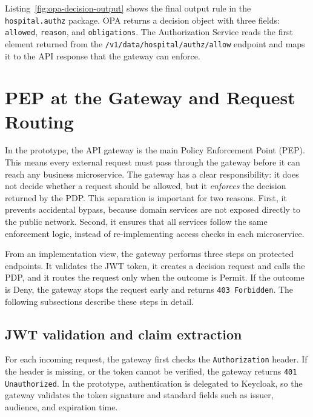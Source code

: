 Listing~\ref{fig:opa-decision-output} shows the final output rule in the \texttt{hospital.authz} package. OPA returns a decision object with three fields: \texttt{allowed}, \texttt{reason}, and \texttt{obligations}. The Authorization Service reads the first element returned from the \texttt{/v1/data/hospital/authz/allow} endpoint and maps it to the API response that the gateway can enforce.


\section{PEP at the Gateway and Request Routing}
\label{sec:gateway_pep}

In the prototype, the API gateway is the main Policy Enforcement Point (PEP). This means every external request must pass
through the gateway before it can reach any business microservice. The gateway has a clear responsibility: it does not
decide whether a request should be allowed, but it \textit{enforces} the decision returned by the PDP. This separation is
important for two reasons. First, it prevents accidental bypass, because domain services are not exposed directly to the
public network. Second, it ensures that all services follow the same enforcement logic, instead of re-implementing access
checks in each microservice.

\vspace{0.5cm}

From an implementation view, the gateway performs three steps on protected endpoints. It validates the JWT token, it
creates a decision request and calls the PDP, and it routes the request only when the outcome is Permit. If the outcome is
Deny, the gateway stops the request early and returns \texttt{403 Forbidden}. The following subsections describe these
steps in detail.

\subsection{JWT validation and claim extraction}
\label{subsec:gateway_jwt}

For each incoming request, the gateway first checks the \texttt{Authorization} header. If the header is missing, or the
token cannot be verified, the gateway returns \texttt{401 Unauthorized}. In the prototype, authentication is delegated to
Keycloak, so the gateway validates the token signature and standard fields such as issuer, audience, and expiration time.

\vspace{0.5cm}


